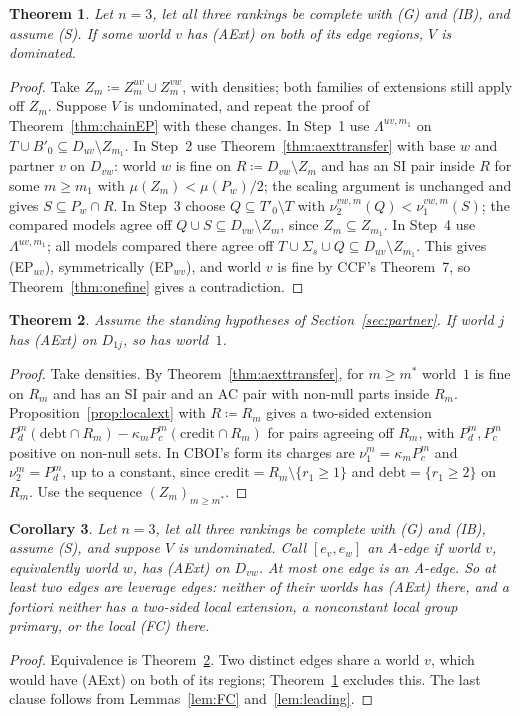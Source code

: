 \documentclass[11pt]{article}
\newtheorem{theorem}{Theorem}
\newtheorem{corollary}[theorem]{Corollary}
\theoremstyle{definition}\newtheorem{definition}[theorem]{Definition}
\theoremstyle{remark}\newtheorem{remark}[theorem]{Remark}
\newcommand{\debt}{\mathrm{debt}}
\newcommand{\cred}{\mathrm{credit}}
\begin{document}
\begin{theorem}\label{thm:aext}
Let $n=3$, let all three rankings be complete with (G) and (IB), and assume
(S). If some world $v$ has (AExt) on both of its edge regions, $V$ is
dominated.
\end{theorem}
\begin{proof}
Take $Z_m\coloneqq Z^{uv}_m\cup Z^{vw}_m$, with densities; both families of
extensions still apply off $Z_m$. Suppose $V$ is undominated, and repeat the
proof of Theorem~\ref{thm:chainEP} with these changes. In Step~1 use
$\Lambda^{uv,m_1}$ on $T\cup B'_0\subseteq D_{uv}\setminus Z_{m_1}$. In
Step~2 use Theorem~\ref{thm:aexttransfer} with base $w$ and partner $v$ on
$D_{vw}$: world $w$ is fine on $R\coloneqq D_{vw}\setminus Z_m$ and has an SI
pair inside $R$ for some $m\ge m_1$ with $\mu(Z_m)<\mu(P_w)/2$; the scaling
argument is unchanged and gives $S\subseteq P_w\cap R$. In Step~3 choose
$Q\subseteq T'_0\setminus T$ with $\nu^{vw,m}_2(Q)<\nu^{vw,m}_1(S)$; the
compared models agree off $Q\cup S\subseteq D_{vw}\setminus Z_m$, since
$Z_m\subseteq Z_{m_1}$. In Step~4 use $\Lambda^{uv,m_1}$; all models compared
there agree off $T\cup\Sigma_s\cup Q\subseteq D_{uv}\setminus Z_{m_1}$. This
gives (EP$_{uv}$), symmetrically (EP$_{wv}$), and world $v$ is fine by CCF's
Theorem~7, so Theorem~\ref{thm:onefine} gives a contradiction.
\end{proof}

\begin{theorem}\label{thm:aextshared}
Assume the standing hypotheses of Section~\ref{sec:partner}. If world $j$ has
(AExt) on $D_{1j}$, so has world~$1$.
\end{theorem}
\begin{proof}
Take densities. By Theorem~\ref{thm:aexttransfer}, for $m\ge m^*$ world~$1$
is fine on $R_m$ and has an SI pair and an AC pair with non-null parts
inside $R_m$. Proposition~\ref{prop:localext} with $R\coloneqq R_m$ gives a
two-sided extension $P^m_d(\debt\cap R_m)-\kappa_mP^m_c(\cred\cap R_m)$ for
pairs agreeing off $R_m$, with $P^m_d,P^m_c$ positive on non-null sets. In
CBOI's form its charges are $\nu^m_1=\kappa_mP^m_c$ and $\nu^m_2=P^m_d$, up to
a constant, since $\cred=R_m\setminus\{r_1\ge1\}$ and $\debt=\{r_1\ge2\}$ on
$R_m$. Use the sequence $(Z_m)_{m\ge m^*}$.
\end{proof}

\begin{corollary}\label{cor:aedge}
Let $n=3$, let all three rankings be complete with (G) and (IB), assume (S),
and suppose $V$ is undominated. Call $[e_v,e_w]$ an \emph{A-edge} if world $v$,
equivalently world $w$, has (AExt) on $D_{vw}$. At most one edge is an
A-edge. So at least two edges are \emph{leverage edges}: neither of their
worlds has (AExt) there, and a fortiori neither has a two-sided local
extension, a nonconstant local group primary, or the local (FC) there.
\end{corollary}
\begin{proof}
Equivalence is Theorem~\ref{thm:aextshared}. Two distinct edges share a world
$v$, which would have (AExt) on both of its regions; Theorem~\ref{thm:aext}
excludes this. The last clause follows from Lemmas~\ref{lem:FC}
and~\ref{lem:leading}.
\end{proof}
\end{document}
